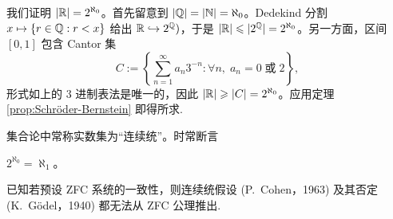\begin{example}[Cantor]
	我们证明 $|\mathbb{R}| = 2^{\aleph_0}$。首先留意到 $|\mathbb{Q}|=|\mathbb{N}|=\aleph_0$。Dedekind 分割 $x \mapsto \{r \in \mathbb{Q}: r < x \}$ 给出 $\mathbb{R} \hookrightarrow 2^{\mathbb{Q}})$，于是 $|\mathbb{R}| \leqslant |2^{\mathbb{Q}}|=2^{\aleph_0}$。另一方面，区间 $[0,1]$ 包含 Cantor 集
	\[ C := \left\{ \sum_{n=1}^\infty a_n 3^{-n}: \forall n,\; a_n = 0 \;\text{或}\; 2  \right\},\]
	形式如上的 $3$ 进制表法是唯一的，因此 $|\mathbb{R}| \geqslant |C| = 2^{\aleph_0}$。应用定理 \ref{prop:Schröder-Bernstein} 即得所求.
\end{example}

集合论中常称实数集为“连续统”。时常断言
\begin{hypothesis}[连续统假设]
	$2^{\aleph_0} = \aleph_1$。
\end{hypothesis}

已知若预设 ZFC 系统的一致性，则连续统假设 (P.\ Cohen，1963) 及其否定 (K.\ Gödel，1940) 都无法从 ZFC 公理推出.

